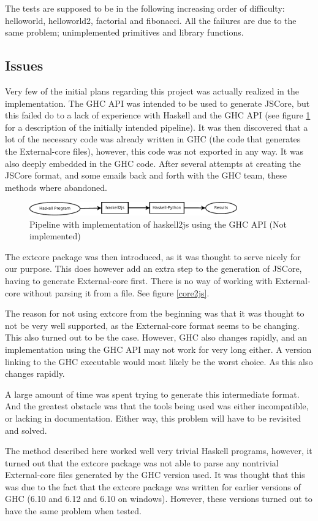The tests are supposed to be in the following increasing order of difficulty: 
helloworld, helloworld2, factorial and fibonacci. 
All the failures are due to the same problem; unimplemented 
primitives and library functions.

\subsection{Issues}


Very few of the initial plans regarding this project was actually realized in 
the implementation. The GHC API was intended to be used to generate JSCore, 
but this failed do to a lack of experience with Haskell and the GHC API 
(see figure \ref{haskell2js} for a description of the initially intended
pipeline). It was then discovered that a lot of the necessary code was already
written in GHC (the code that generates the External-core files), however, 
this code was not exported in any way. It was also deeply embedded in the GHC 
code. After several attempts at creating the JSCore format, and some emails back 
and forth with the GHC team, these methods where abandoned.

\begin{figure}[H]
\begin{center}
\includegraphics[width=0.8\textwidth]{diags/pipe_w_haskell2js}
\caption[Pipeline without haskell2js]{Pipeline with implementation of haskell2js using the GHC API (Not implemented)}
\label{haskell2js}
\end{center}
\end{figure}

The extcore package was then introduced, as it was thought to serve nicely for our purpose. This
does however add an extra step to the generation of JSCore, having to generate External-core
first. There is no way of working with External-core without parsing it from a file. See figure \ref{core2js}.

The reason for not using extcore from the beginning was that it was thought to not be very 
well supported, as the External-core format seems to be changing. This also turned out to be
the case. However, GHC also changes rapidly, and an implementation using the GHC API may not
work for very long either. A version linking to the GHC executable would most likely be the
worst choice. As this also changes rapidly.

A large amount of time was spent trying to generate this intermediate format. And the
greatest obstacle was that the tools being used was either incompatible, or lacking in
documentation. Either way, this problem will have to be revisited and solved.

The method described here worked well very trivial Haskell programs, however, 
it turned out that
the extcore package was not able to parse any nontrivial External-core files generated 
by the GHC version used. It was thought that this was due to the fact that the extcore
package was written for earlier versions of GHC (6.10 and 6.12 and 6.10 on windows). However, 
these versions turned out to have the same problem when tested.

